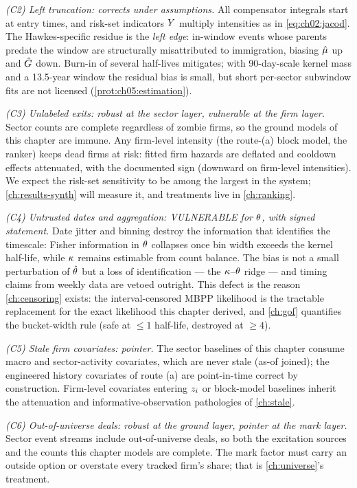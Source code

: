 \emph{(C2) Left truncation: corrects under assumptions.} All compensator
integrals start at entry times, and risk-set indicators $Y$
multiply intensities as in \cref{eq:ch02:jacod}. The Hawkes-specific
residue is the \emph{left edge}: in-window events whose parents predate
the window are structurally misattributed to immigration, biasing
$\hat{\mu}$ up and $\hat{G}$ down. Burn-in of several half-lives
mitigates; with 90-day-scale kernel mass and a 13.5-year window the
residual bias is small, but short per-sector subwindow fits are not
licensed (\cref{prot:ch05:estimation}).

\emph{(C3) Unlabeled exits: robust at the sector layer, vulnerable at the
firm layer.} Sector counts are complete regardless of zombie firms, so
the ground models of this chapter are immune. Any firm-level intensity
(the route-(a) block model, the ranker) keeps dead firms at risk:
fitted firm hazards are deflated and cooldown effects attenuated, with
the documented sign (downward on firm-level intensities). We expect the
risk-set sensitivity to be among the largest in the system;
\cref{ch:results-synth} will measure it, and treatments live in
\cref{ch:ranking}.

\emph{(C4) Untrusted dates and aggregation: VULNERABLE for $\theta$, with
signed statement.} Date jitter and binning destroy the information that
identifies the timescale: Fisher information in $\theta$ collapses once
bin width exceeds the kernel half-life, while $\kappa$ remains estimable
from count balance. The bias is not a small perturbation of $\hat{\theta}$
but a loss of identification --- the $\kappa$--$\theta$ ridge --- and
timing claims from weekly data are vetoed outright. This defect is the
reason \cref{ch:censoring} exists: the interval-censored MBPP likelihood
is the tractable replacement for the exact likelihood this chapter
derived, and \cref{ch:gof} quantifies the bucket-width rule (safe at
$\le 1$ half-life, destroyed at $\ge 4$).

\emph{(C5) Stale firm covariates: pointer.} The sector baselines of this
chapter consume macro and sector-activity covariates, which are never
stale (as-of joined); the engineered history covariates of route (a) are
point-in-time correct by construction. Firm-level covariates entering
$z_i$ or block-model baselines inherit the attenuation and
informative-observation pathologies of \cref{ch:stale}.

\emph{(C6) Out-of-universe deals: robust at the ground layer, pointer at
the mark layer.} Sector event streams include out-of-universe deals, so
both the excitation sources and the counts this chapter models are
complete. The mark factor must carry an outside option or overstate every
tracked firm's share; that is \cref{ch:universe}'s treatment.

